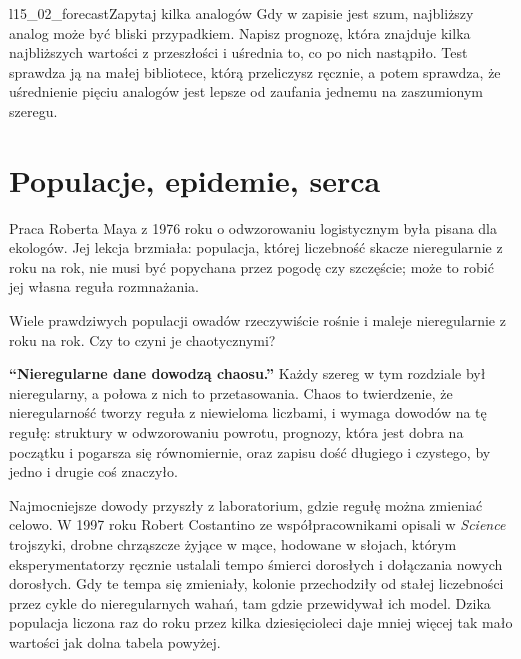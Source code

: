 \begin{lab}{l15_02_forecast}{Zapytaj kilka analogów}
Gdy w zapisie jest szum, najbliższy analog może być bliski przypadkiem.
Napisz prognozę, która znajduje kilka najbliższych wartości z przeszłości i
uśrednia to, co po nich nastąpiło. Test sprawdza ją na małej bibliotece,
którą przeliczysz ręcznie, a potem sprawdza, że uśrednienie pięciu analogów
jest lepsze od zaufania jednemu na zaszumionym szeregu.
\end{lab}

\section{Populacje, epidemie, serca}
\label{sec:ch15-life}

\noindent
Praca Roberta Maya z 1976 roku o odwzorowaniu logistycznym była pisana dla
ekologów. Jej lekcja brzmiała: populacja, której liczebność skacze
nieregularnie z roku na rok, nie musi być popychana przez pogodę czy
szczęście; może to robić jej własna reguła rozmnażania.

\begin{think}
Wiele prawdziwych populacji owadów rzeczywiście rośnie i maleje nieregularnie
z roku na rok. Czy to czyni je chaotycznymi?
\end{think}

\begin{trapbox}
\textbf{\enquote{Nieregularne dane dowodzą chaosu.}} Każdy szereg w tym
rozdziale był nieregularny, a połowa z nich to przetasowania. Chaos to
twierdzenie, że nieregularność tworzy reguła z niewieloma liczbami, i wymaga
dowodów na tę regułę: struktury w odwzorowaniu powrotu, prognozy, która jest
dobra na początku i pogarsza się równomiernie, oraz zapisu dość długiego i
czystego, by jedno i drugie coś znaczyło.
\end{trapbox}

\noindent
Najmocniejsze dowody przyszły z laboratorium, gdzie regułę można zmieniać
celowo. W 1997 roku Robert Costantino ze współpracownikami opisali w
\emph{Science} trojszyki, drobne chrząszcze żyjące w mące, hodowane w
słojach, którym eksperymentatorzy ręcznie ustalali tempo śmierci dorosłych i
dołączania nowych dorosłych. Gdy te tempa się zmieniały, kolonie przechodziły
od stałej liczebności przez cykle do nieregularnych wahań, tam gdzie
przewidywał ich model. Dzika populacja liczona raz do roku przez kilka
dziesięcioleci daje mniej więcej tak mało wartości jak dolna tabela powyżej.

